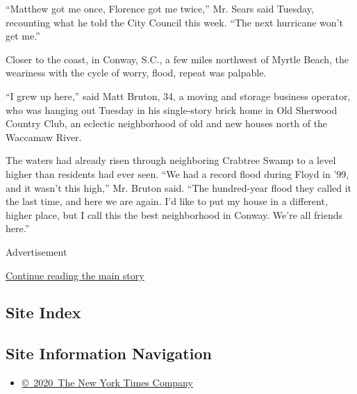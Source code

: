 ``Matthew got me once, Florence got me twice,'' Mr. Sears said Tuesday,
recounting what he told the City Council this week. ``The next hurricane
won't get me.''

Closer to the coast, in Conway, S.C., a few miles northwest of Myrtle
Beach, the weariness with the cycle of worry, flood, repeat was
palpable.

``I grew up here,'' said Matt Bruton, 34, a moving and storage business
operator, who was hanging out Tuesday in his single-story brick home in
Old Sherwood Country Club, an eclectic neighborhood of old and new
houses north of the Waccamaw River.

The waters had already risen through neighboring Crabtree Swamp to a
level higher than residents had ever seen. ``We had a record flood
during Floyd in '99, and it wasn't this high,'' Mr. Bruton said. ``The
hundred-year flood they called it the last time, and here we are again.
I'd like to put my house in a different, higher place, but I call this
the best neighborhood in Conway. We're all friends here.''

Advertisement

\protect\hyperlink{after-bottom}{Continue reading the main story}

\hypertarget{site-index}{%
\subsection{Site Index}\label{site-index}}

\hypertarget{site-information-navigation}{%
\subsection{Site Information
Navigation}\label{site-information-navigation}}

\begin{itemize}
\tightlist
\item
  \href{https://help.nytimes.com/hc/en-us/articles/115014792127-Copyright-notice}{©~2020~The
  New York Times Company}
\end{itemize}

